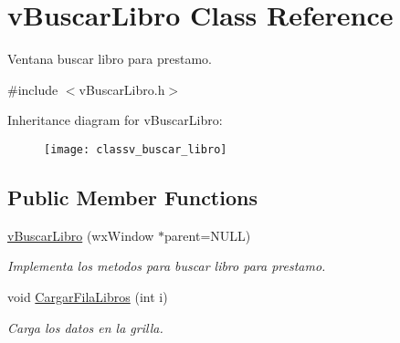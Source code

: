 \hypertarget{classv_buscar_libro}{}\section{v\+Buscar\+Libro Class Reference}
\label{classv_buscar_libro}


Ventana buscar libro para prestamo.  




{\ttfamily \#include $<$v\+Buscar\+Libro.\+h$>$}

Inheritance diagram for v\+Buscar\+Libro\+:\begin{figure}[H]
\begin{center}
\leavevmode
\texttt{[image: classv\_buscar\_libro]}
\end{center}
\end{figure}
\subsection*{Public Member Functions}
\begin{DoxyCompactItemize}
\item 
\hyperlink{classv_buscar_libro_aed0b47d6d8b0b840c4b3c16b80f80957}{v\+Buscar\+Libro} (wx\+Window $\ast$parent=N\+U\+LL)\hypertarget{classv_buscar_libro_aed0b47d6d8b0b840c4b3c16b80f80957}{}\label{classv_buscar_libro_aed0b47d6d8b0b840c4b3c16b80f80957}

\begin{DoxyCompactList}\small\item\em Implementa los metodos para buscar libro para prestamo. \end{DoxyCompactList}\item 
void \hyperlink{classv_buscar_libro_a90c6d94b423998ae8853f97f6f3852c7}{Cargar\+Fila\+Libros} (int i)\hypertarget{classv_buscar_libro_a90c6d94b423998ae8853f97f6f3852c7}{}\label{classv_buscar_libro_a90c6d94b423998ae8853f97f6f3852c7}

\begin{DoxyCompactList}\small\item\em Carga los datos en la grilla. \end{DoxyCompactList}\end{DoxyCompactItemize}
